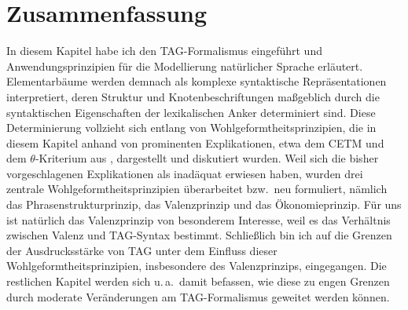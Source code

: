\section{Zusammenfassung}

In diesem Kapitel habe ich den TAG-Formalismus eingeführt und Anwendungsprinzipien für die Modellierung natürlicher Sprache erläutert. Elementarbäume werden demnach als komplexe syntaktische Repräsentationen interpretiert, deren Struktur und Knotenbeschriftungen maßgeblich durch die syntaktischen Eigenschaften der lexikalischen Anker determiniert sind. Diese Determinierung vollzieht sich entlang von Wohlgeformtheitsprinzipien, die in diesem Kapitel anhand von prominenten Explikationen, etwa dem CETM und dem $\theta$-Kriterium aus \cite{Frank:02}, dargestellt und diskutiert wurden. Weil sich die bisher vorgeschlagenen Explikationen als inadäquat erwiesen haben, wurden drei zentrale Wohlgeformtheitsprinzipien überarbeitet bzw.\ neu formuliert, nämlich das Phrasenstrukturprinzip, das Valenzprinzip und das Ökonomieprinzip. Für uns ist natürlich das Valenzprinzip von besonderem Interesse, weil es das Verhältnis zwischen Valenz und TAG-Syntax bestimmt. Schließlich bin ich auf die Grenzen der Ausdrucksstärke von TAG unter dem Einfluss dieser Wohlgeformtheitsprinzipien, insbesondere des Valenzprinzips, eingegangen. Die restlichen Kapitel werden sich u.\,a.\ damit befassen, wie diese zu engen Grenzen durch moderate Veränderungen am TAG-Formalismus geweitet werden können. 



